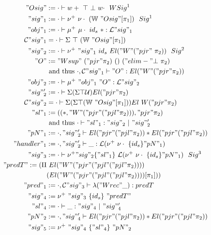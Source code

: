 \begin{align*}
  "Osig" &:= \goodWSig{\cdot}{w+ \ \top \ \bot \  w\cdot}{1} \\
  "sig"_1 &:= \goodSig{\cdot}{\nu^+ \ \nu\cdot  \ (\bW \ "Osig"[\pi_1])}{1}  \\
  "obj"_1 &:= \goodTerm{\cdot}{\mu^+ \ \mu\cdot \ {id_s} \ *}{\cL"sig"_1}\\
  \cC"sig"_1 &= \goodType{\cdot}{\Sigma \ \top \ (\bW \ "Osig"[\pi_1]) }{} \\
  "sig"_2 &:=  \goodSig{\cdot}{\nu^+ \ "sig"_1 \ {id_s} \ El ("W" ("pjr" \ \pi_2))}{2} \\ 
  "O" &:= {"Wsup" \ ("pjr" \pi_2) \ () \ ("elim-"\bot \ \pi_2)}  \\ 
  & \text{ and thus }  \goodTerm{\cdot, \cC"sig"_1}{"O"}{El ("W" ("pjr" \pi_2))} \\
  "obj"_2 &:= \goodTerm{\cdot}{\mu^+ \ "obj"_1 \ "O"}{\cL"sig"_2} \\
  "sig"_2' &:= \goodType{\cdot}{\Sigma (\Sigma \top \cU)El ("pjr" \pi_2)}{} \\ 
  \cC"sig"_2 &= \goodType{\cdot}{\Sigma (\Sigma \top (\bW \ "Osig"[\pi_1]))El \ W("pjr" \pi_2) }{} \\ 
  "sl"_1 &:= ((*, "W" ("pjr" ("pjl" \pi_2)) ), "pjr" \pi_2) \\ 
  & \text{ and thus }  \goodSeal{\cdot}{"sl"_1}{"sig"_2}{"sig"_2'} \\
  "pN"_1 &:= \goodType{\cdot, "sig"_2'}{El ("pjr" ("pjl" \pi_2)) * El ("pjr" ("pjl" \pi_2))}{} \\
  "handler"_1 & := \goodTerm{\cdot, "sig"_2'}{\_}{\cL(\nu^+ \ \nu\cdot \ \{id_s\} "pN"_1)} \\
  "sig"_3 &:= \goodSig{\cdot}{\nu^+ "sig"_2 \{"sl"_1\} \ \cL(\nu^+ \ \nu\cdot \ \{id_s\} "pN"_1)}{3} \\ 
  "predT" := (\Pi & \ El ("W"("pjr" ("pjl" ("pjl" \pi_2)))) \\  
  & (El ("W" ("pjr" ("pjl" ("pjl" \pi_2))))[\pi_1])) \\
  "pred"_1 & := \goodTerm{\cdot, \cC "sig"_3}{\lambda ("Wrec" \_)}{predT} \\ 
  "sig"_4 &:= \nu^+ \ "sig"_3 \ \{id_s\} \ "predT" \\ 
  "sl"_4 &:= \goodSeal{\cdot}{\_}{"sig"_4}{"sig"_4'} \\ 
  "pN"_2 &:= \goodType{\cdot, "sig"_4'}{El ("pjr" ("pjl" \pi_2)) * El ("pjr" ("pjl" \pi_2))}{} \\
  "sig"_5 &:= \nu^+ \ "sig"_4 \ \{"sl"_4\} \  "pN"_2 \\ 

\end{align*}
